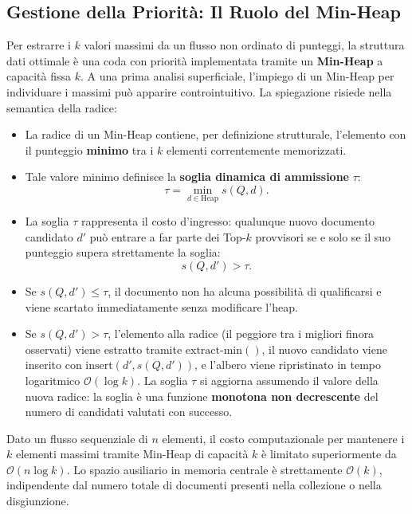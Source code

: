 \subsection{Gestione della Priorit\`a: Il Ruolo del Min-Heap}
Per estrarre i $k$ valori massimi da un flusso non ordinato di punteggi, la struttura dati ottimale \`e una coda con priorit\`a implementata tramite un \textbf{Min-Heap} a capacit\`a fissa $k$.  
A una prima analisi superficiale, l'impiego di un Min-Heap per individuare i massimi pu\`o apparire controintuitivo. La spiegazione risiede nella semantica della radice:
\begin{itemize}
    \item La radice di un Min-Heap contiene, per definizione strutturale, l'elemento con il punteggio \textbf{minimo} tra i $k$ elementi correntemente memorizzati.
    \item Tale valore minimo definisce la \textbf{soglia dinamica di ammissione} $\tau$:
    \begin{equation}
        \tau = \min_{d \in \text{Heap}} s(Q, d).
        \label{eq:tau-definizione}
    \end{equation}
    \item La soglia $\tau$ rappresenta il costo d'ingresso: qualunque nuovo documento candidato $d'$ pu\`o entrare a far parte dei Top-$k$ provvisori se e solo se il suo punteggio supera strettamente la soglia:
    \begin{equation}
        s(Q, d') > \tau.
    \end{equation}
    \item Se $s(Q, d') \le \tau$, il documento non ha alcuna possibilit\`a di qualificarsi e viene scartato immediatamente senza modificare l'heap.
    \item Se $s(Q, d') > \tau$, l'elemento alla radice (il peggiore tra i migliori finora osservati) viene estratto tramite $\text{extract-min}()$, il nuovo candidato viene inserito con $\text{insert}(d', s(Q, d'))$, e l'albero viene ripristinato in tempo logaritmico $\mathcal{O}(\log k)$. La soglia $\tau$ si aggiorna assumendo il valore della nuova radice: la soglia \`e una funzione \textbf{monotona non decrescente} del numero di candidati valutati con successo.
\end{itemize}

\begin{property}
Dato un flusso sequenziale di $n$ elementi, il costo computazionale per mantenere i $k$ elementi massimi tramite Min-Heap di capacit\`a $k$ \`e limitato superiormente da $\mathcal{O}(n \log k)$. Lo spazio ausiliario in memoria centrale \`e strettamente $\mathcal{O}(k)$, indipendente dal numero totale di documenti presenti nella collezione o nella disgiunzione.
\end{property}

